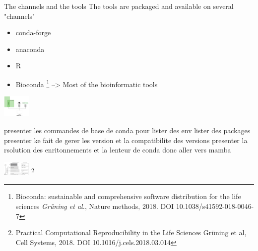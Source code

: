 \begin{frame}{The channels and the tools}
The tools are packaged and available on several "channels"
\begin{itemize}
\item conda-forge
\item anaconda
\item R
\item Bioconda \footnote{Bioconda: sustainable and comprehensive software distribution for the life sciences \textit{Grüning et al.}, Nature methods, 2018. DOI 10.1038/s41592-018-0046-7} --> Most of the bioinformatic tools
\end{itemize}
\includegraphics[width=0.1\textwidth]{images/conda_env_detail.pdf} 
\end{frame}

\begin{frame}
presenter les commandes de base de conda pour lister des env lister des packages 
presenter ke fait de gerer les version et la compatibilite des versions
presenter la rsolution des enritonnements et la lenteur de conda donc aller vers mamba

\end{frame}

\begin{frame}
\includegraphics[width=0.1\textwidth]{images/reproductibility.jpg} \footnote{Practical Computational Reproducibility in the Life Sciences
Grüning et al, Cell Systems, 2018. DOI 10.1016/j.cels.2018.03.014}

\end{frame}